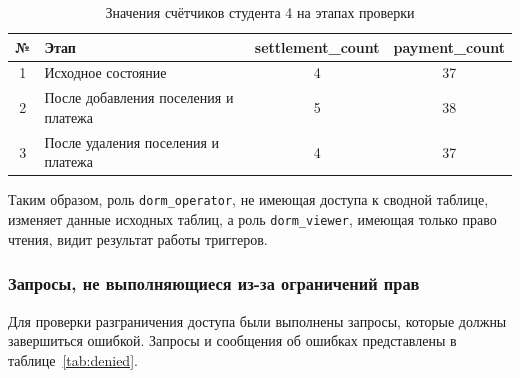 \begin{table}[H]
\centering
\caption{Значения счётчиков студента 4 на этапах проверки}
\label{tab:lab3_summary}
\small
\begin{tabularx}{\textwidth}{|c|X|c|c|}
\hline
\textbf{№} & \textbf{Этап} & \textbf{settlement\_count} & \textbf{payment\_count} \\ \hline
1 & Исходное состояние & 4 & 37 \\ \hline
2 & После добавления поселения и платежа & 5 & 38 \\ \hline
3 & После удаления поселения и платежа & 4 & 37 \\ \hline
\end{tabularx}
\end{table}

Таким образом, роль \texttt{dorm\_operator}, не имеющая доступа к сводной таблице, изменяет данные исходных таблиц, а роль \texttt{dorm\_viewer}, имеющая только право чтения, видит результат работы триггеров.

\subsubsection{Запросы, не выполняющиеся из-за ограничений прав}

Для проверки разграничения доступа были выполнены запросы, которые должны завершиться ошибкой. Запросы и сообщения об ошибках представлены в таблице~\ref{tab:denied}.

